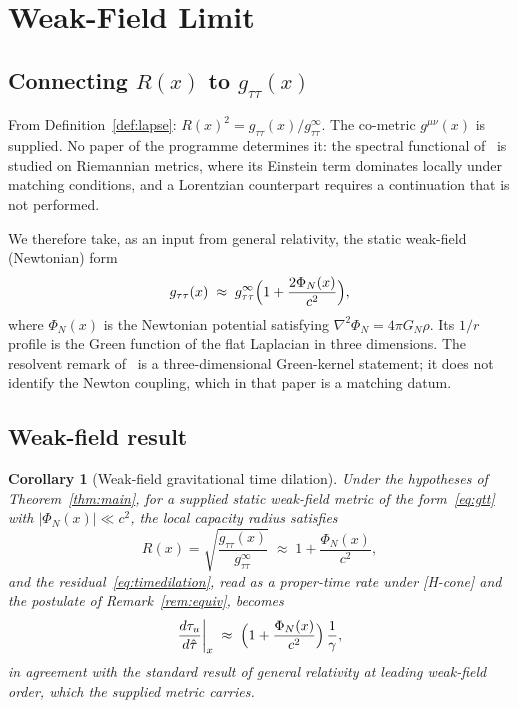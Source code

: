 \documentclass[11pt,a4paper]{article}
\newtheorem{corollary}[theorem]{Corollary}
\begin{document}
  \section{Weak-Field Limit}\label{sec:weakfield}

  \subsection{Connecting $R(x)$ to $g_{\tau\tau}(x)$}

    From Definition~\ref{def:lapse}: $R(x)^2 = g_{\tau\tau}(x)/g_{\tau\tau}^\infty$.
    The co-metric $g^{\mu\nu}(x)$ is supplied.
    No paper of the programme determines it: the spectral functional of~\cite{Beau2026h} is studied on Riemannian
    metrics, where its Einstein term dominates locally under matching conditions, and a Lorentzian counterpart
    requires a continuation that is not performed.

    We therefore take, as an input from general relativity, the static weak-field (Newtonian) form
    \begin{equation}\label{eq:gtt}
      g_{\tau\tau}(x) \;\approx\; g_{\tau\tau}^\infty\Bigl(1+\frac{2\Phi_N(x)}{c^2}\Bigr),
    \end{equation}
    where $\Phi_N(x)$ is the Newtonian potential satisfying $\nabla^2\Phi_N = 4\pi G_N \rho$.
    Its $1/r$ profile is the Green function of the flat Laplacian in three dimensions.
    The resolvent remark of~\cite{Beau2026h} is a three-dimensional Green-kernel statement; it does not identify
    the Newton coupling, which in that paper is a matching datum.

  \subsection{Weak-field result}

    \begin{corollary}[Weak-field gravitational time dilation]\label{cor:weakfield}
      Under the hypotheses of Theorem~\ref{thm:main}, for a supplied static weak-field metric of the
      form~\eqref{eq:gtt} with $|\Phi_N(x)| \ll c^2$, the local capacity radius satisfies
      \begin{equation}\label{eq:Rweak}
        R(x) = \sqrt{\frac{g_{\tau\tau}(x)}{g_{\tau\tau}^\infty}} \;\approx\; 1+\frac{\Phi_N(x)}{c^2},
      \end{equation}
      and the residual~\eqref{eq:timedilation}, read as a proper-time rate under [H-cone] and the postulate of
      Remark~\ref{rem:equiv}, becomes
      \begin{equation}\label{eq:timedilation-weak}
        \frac{d\tau_u}{d\hat\tau}\bigg|_x
        \;\approx\; \Bigl(1+\frac{\Phi_N(x)}{c^2}\Bigr)\,\frac{1}{\gamma},
      \end{equation}
      in agreement with the standard result of general relativity at leading weak-field order, which the
      supplied metric carries.
    \end{corollary}
\end{document}

